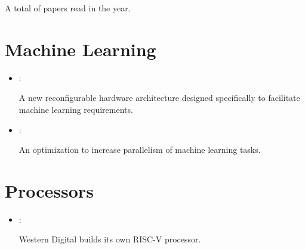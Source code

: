 



A total of  papers read in the year.

\section*{Machine Learning}
\begin{itemize}
    \item \cite{Prabhakar:Plasticine:2017}:

    A new reconfigurable hardware architecture designed specifically to facilitate machine learning requirements.

    \item \cite{Yuanzhong:Cross-Replica-Sharding:2020}:

    An optimization to increase parallelism of machine learning tasks.
\end{itemize}

\section*{Processors}
\begin{itemize}
    \item \cite{Wheeler:WD-RISC-V:2019}:

    Western Digital builds its own RISC-V processor.
\end{itemize}

